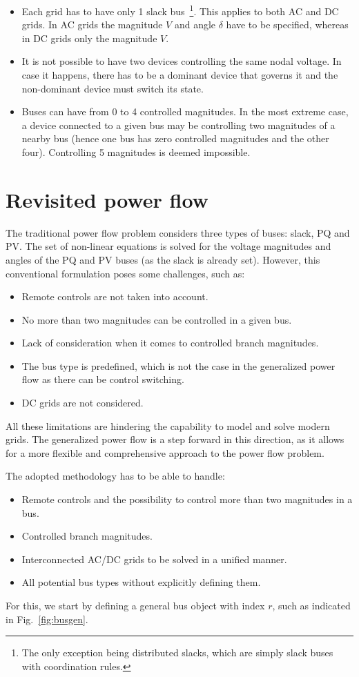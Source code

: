\documentclass[11pt]{article}
\begin{document}
	\begin{itemize}
		\item Each grid has to have only 1 slack bus~\footnote{The only exception being distributed slacks, which are simply slack buses with coordination rules.}. This applies to both AC and DC grids. In AC grids the magnitude $V$ and angle $\delta$ have to be specified, whereas in DC grids only the magnitude $V$.
		\item It is not possible to have two devices controlling the same nodal voltage. In case it happens, there has to be a dominant device that governs it and the non-dominant device must switch its state.
		\item Buses can have from 0 to 4 controlled magnitudes. In the most extreme case, a device connected to a given bus may be controlling two magnitudes of a nearby bus (hence one bus has zero controlled magnitudes and the other four). Controlling 5 magnitudes is deemed impossible.
	\end{itemize}


\newpage
\section{Revisited power flow}
The traditional power flow problem considers three types of buses: slack, PQ and PV. The set of non-linear equations is solved for the voltage magnitudes and angles of the PQ and PV buses (as the slack is already set). However, this conventional formulation poses some challenges, such as:
\begin{itemize}
	\item Remote controls are not taken into account.
	\item No more than two magnitudes can be controlled in a given bus.
	\item Lack of consideration when it comes to controlled branch magnitudes.
	\item The bus type is predefined, which is not the case in the generalized power flow as there can be control switching.
	\item DC grids are not considered.
\end{itemize}
All these limitations are hindering the capability to model and solve modern grids. The generalized power flow is a step forward in this direction, as it allows for a more flexible and comprehensive approach to the power flow problem.

The adopted methodology has to be able to handle:
\begin{itemize}
	\item Remote controls and the possibility to control more than two magnitudes in a bus.
	\item Controlled branch magnitudes.
	\item Interconnected AC/DC grids to be solved in a unified manner.
	\item All potential bus types without explicitly defining them.
\end{itemize}
For this, we start by defining a general bus object with index $r$, such as indicated in Fig.~\ref{fig:busgen}.
\end{document}
